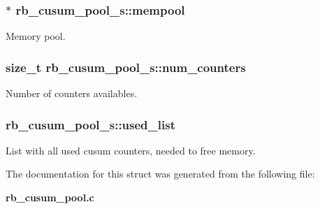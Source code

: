 \subsubsection[{mempool}]{$\ast$ rb\+\_\+cusum\+\_\+pool\+\_\+s\+::mempool}\label{structrb__cusum__pool__s_a4f1bcc699f605bd1cc5b8f10c6a731ea}


Memory pool. 

\subsubsection[{num\+\_\+counters}]{\setlength{\rightskip}{0pt plus 5cm}size\+\_\+t rb\+\_\+cusum\+\_\+pool\+\_\+s\+::num\+\_\+counters}\label{structrb__cusum__pool__s_a1bfbe193dcf26a55b6f056ecb19d8c14}


Number of counters availables. 

\subsubsection[{used\+\_\+list}]{ rb\+\_\+cusum\+\_\+pool\+\_\+s\+::used\+\_\+list}\label{structrb__cusum__pool__s_a75d7dff9e8949d03cd92dabb113d31b8}


List with all used cusum counters, needed to free memory. 



The documentation for this struct was generated from the following file\+:\begin{DoxyCompactItemize}
\item 
{\bf rb\+\_\+cusum\+\_\+pool.\+c}\end{DoxyCompactItemize}
